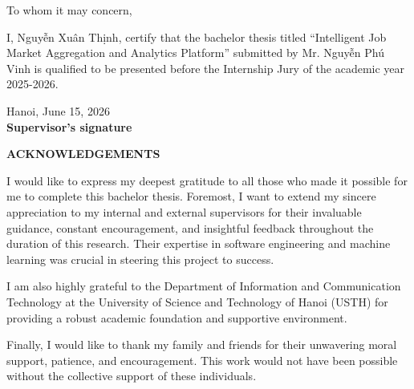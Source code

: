 \documentclass[12pt, a4paper]{report}
\begin{document}
\newpage
{} %
\setcounter{page}{1} %
\vspace*{3cm}

\begin{center}
    To whom it may concern,
\end{center}

\vspace{1cm}

\noindent I, Nguyễn Xuân Thịnh, certify that the bachelor thesis titled ``Intelligent Job Market Aggregation and Analytics Platform'' submitted by Mr. Nguyễn Phú Vinh is qualified to be presented before the Internship Jury of the academic year 2025-2026.

\vspace{2.5cm}

\begin{flushright}
    Hanoi, June 15, 2026 \\[1.5cm]
    \textbf{Supervisor's signature}
\end{flushright}

\newpage
{}
\begin{center}
    {\LARGE \textbf{ACKNOWLEDGEMENTS}\par}
\end{center}
\vspace{1cm}

\noindent I would like to express my deepest gratitude to all those who made it possible for me to complete this bachelor thesis. Foremost, I want to extend my sincere appreciation to my internal and external supervisors for their invaluable guidance, constant encouragement, and insightful feedback throughout the duration of this research. Their expertise in software engineering and machine learning was crucial in steering this project to success.

I am also highly grateful to the Department of Information and Communication Technology at the University of Science and Technology of Hanoi (USTH) for providing a robust academic foundation and supportive environment.

Finally, I would like to thank my family and friends for their unwavering moral support, patience, and encouragement. This work would not have been possible without the collective support of these individuals.
\end{document}
